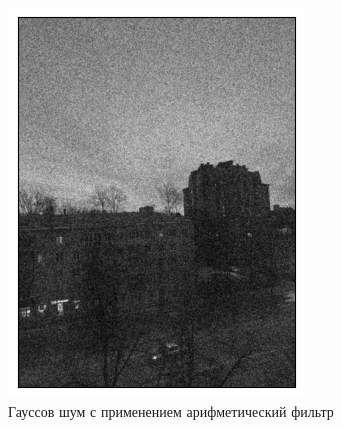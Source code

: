 \documentclass[a4paper,12pt]{article}
\begin{document}
\begin{figure}[H]
    \begin{minipage}{0.49\textwidth}
        \centering \includegraphics[width=\textwidth]{results/lpf_gaus_1.png}
        \caption{Гауссов шум с применением арифметический фильтр}
    \end{minipage}\hfill
    \begin{minipage}{0.49\textwidth}

\end{minipage}
\end{figure}
\end{document}
